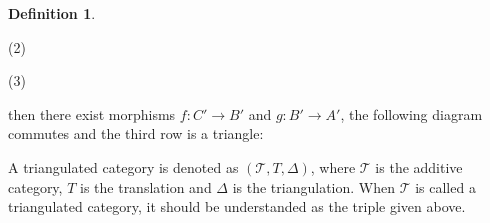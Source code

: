 \documentclass[12pt]{article}
\theoremstyle{definition}
\newtheorem{definition}{Definition}[section]
\theoremstyle{remark}
\begin{document}
\begin{definition}
\begin{enumerate}
\begin{center}
                        (2)
    
                        (3)
                    \end{center}
                    then there exist morphisms $f : C' \rightarrow B'$ and $g : B' \rightarrow A'$, the following diagram commutes and the third row is a triangle:

                    \begin{center}
                    \end{center}
            \end{enumerate}
        \end{definition}

        A triangulated category is denoted as $(\mathcal{T}, T, \Delta)$, where $\mathcal{T}$ is the additive category, $T$ is the translation and $\Delta$ is the triangulation. When $\mathcal{T}$ is called a triangulated category, it should be understanded as the triple given above.
\end{document}

